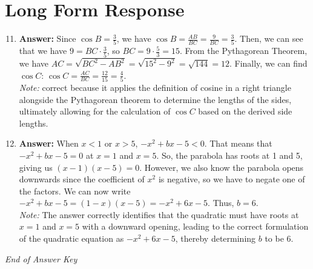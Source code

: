\documentclass[12pt]{article}
\begin{document}
\section*{Long Form Response}
\begin{enumerate}[label=\arabic*.]
\setcounter{enumi}{10}
\item \textbf{Answer:} Since $\cos{B}=\frac{3}{5}$, we have $\cos{B}=\frac{AB}{BC}=\frac{9}{BC}=\frac{3}{5}$. Then, we can see that we have $9=BC\cdot\frac{3}{5}$, so $BC=9\cdot\frac{5}{3}=15$. From the Pythagorean Theorem, we have $AC=\sqrt{BC^2-AB^2}=\sqrt{15^2-9^2}=\sqrt{144}=12$. Finally, we can find $\cos{C}$: $\cos{C}=\frac{AC}{BC}=\frac{12}{15}=\boxed{\frac{4}{5}}$.
\\ \textit{Note:} correct because it applies the definition of cosine in a right triangle alongside the Pythagorean theorem to determine the lengths of the sides, ultimately allowing for the calculation of $\cos C$ based on the derived side lengths.
\item \textbf{Answer:} When $x<1$ or $x>5$, $-x^2+bx-5<0$. That means that $-x^2+bx-5=0$ at $x=1$ and $x=5$. So, the parabola has roots at 1 and 5, giving us $(x-1)(x-5)=0$. However, we also know the parabola opens downwards since the coefficient of $x^2$ is negative, so we have to negate one of the factors. We can now write $-x^2+bx-5=(1-x)(x-5)=-x^2+6 x-5$. Thus, $b=\boxed{6}$.
\\ \textit{Note:} The answer correctly identifies that the quadratic must have roots at \(x=1\) and \(x=5\) with a downward opening, leading to the correct formulation of the quadratic equation as \(-x^2 + 6 x - 5\), thereby determining \(b\) to be 6.
\end{enumerate}

\vfill
\noindent\textit{End of Answer Key}
\end{document}
